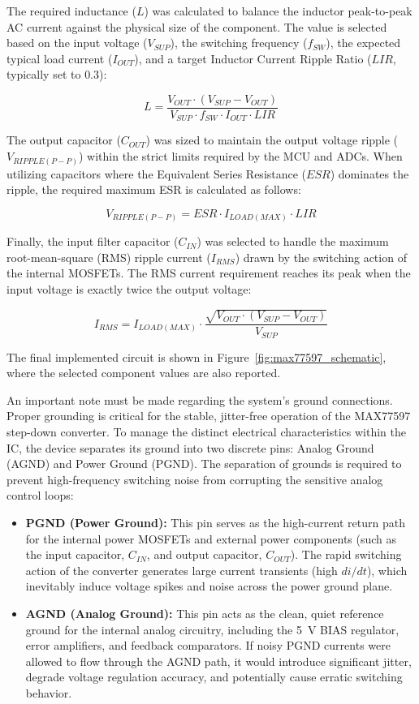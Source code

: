 The required inductance ($L$) was calculated to balance the inductor peak-to-peak AC current against the physical size of the component. The value is selected based on the input voltage ($V_{SUP}$), the switching frequency ($f_{SW}$), the expected typical load current ($I_{OUT}$), and a target Inductor Current Ripple Ratio ($LIR$, typically set to $0.3$):

$$L = \frac{V_{OUT} \cdot (V_{SUP} - V_{OUT})}{V_{SUP} \cdot f_{SW} \cdot I_{OUT} \cdot LIR}$$

The output capacitor ($C_{OUT}$) was sized to maintain the output voltage ripple ($V_{RIPPLE(P-P)}$) within the strict limits required by the MCU and ADCs. When utilizing capacitors where the Equivalent Series Resistance ($ESR$) dominates the ripple, the required maximum ESR is calculated as follows:

$$V_{RIPPLE(P-P)} = ESR \cdot I_{LOAD(MAX)} \cdot LIR$$

Finally, the input filter capacitor ($C_{IN}$) was selected to handle the maximum root-mean-square (RMS) ripple current ($I_{RMS}$) drawn by the switching action of the internal MOSFETs. The RMS current requirement reaches its peak when the input voltage is exactly twice the output voltage:

$$I_{RMS} = I_{LOAD(MAX)} \cdot \frac{\sqrt{V_{OUT} \cdot (V_{SUP} - V_{OUT})}}{V_{SUP}}$$

The final implemented circuit is shown in Figure~\ref{fig:max77597_schematic}, where the selected component values are also reported.

An important note must be made regarding the system's ground connections. Proper grounding is critical for the stable, jitter-free operation of the MAX77597 step-down converter. To manage the distinct electrical characteristics within the IC, the device separates its ground into two discrete pins: Analog Ground (AGND) and Power Ground (PGND). The separation of grounds is required to prevent high-frequency switching noise from corrupting the sensitive analog control loops:
\begin{itemize}
    \item \textbf{PGND (Power Ground):} This pin serves as the high-current return path for the internal power MOSFETs and external power components (such as the input capacitor, $C_{IN}$, and output capacitor, $C_{OUT}$). The rapid switching action of the converter generates large current transients (high $di/dt$), which inevitably induce voltage spikes and noise across the power ground plane.
    \item \textbf{AGND (Analog Ground):} This pin acts as the clean, quiet reference ground for the internal analog circuitry, including the \SI{5}{\volt} BIAS regulator, error amplifiers, and feedback comparators. If noisy PGND currents were allowed to flow through the AGND path, it would introduce significant jitter, degrade voltage regulation accuracy, and potentially cause erratic switching behavior.
\end{itemize}


